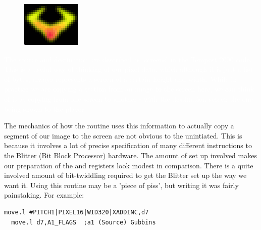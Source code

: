 \begin{definition}
\setlength{\intextsep}{0pt}%
\setlength{\columnsep}{3pt}%
\begin{figure}
\includegraphics[width=\linewidth]{src/callout/claw.png} 
\end{figure}
\small
\textcolor{white}{
  The source and destination are described as 'screens' in the Tempest 2000 code. This is a useful way of thinking of our pixel data, which
  although it is just a list of bytes, always represents a screen of a certain height and width. While in practice we are copying a section from an image
  to the screen here, we can think of it as copying from one screen to another - with the destination screen the one being shown to the player.
}
\end{definition}

The mechanics of how the  routine uses this information to actually copy a segment of our image
to the screen are not obvious to the unintiated. This is because it involves a lot of precise specification of many different
instructions to the Blitter (Bit Block Processor) hardware. The amount of set up involved makes our preparation of the 
and  registers look modest in comparison. There is a quite involved amount of bit-twiddling required to get the Blitter
set up the way we want it. Using this routine may be a 'piece of piss', but writing it was fairly painstaking. For example:

\begin{lstlisting}[escapechar=\%]
  move.l #PITCH1|PIXEL16|WID320|XADDINC,d7
  move.l d7,A1_FLAGS  ;a1 (Source) Gubbins
\end{lstlisting}

